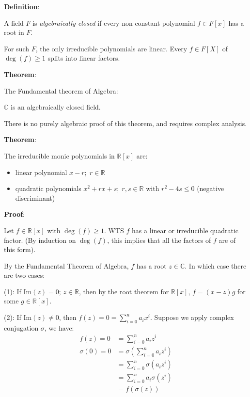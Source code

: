 \documentclass{article}
\begin{document}
\begin{multicols*}{2}
\textbf{Definition}:

A field $F$ is \textit{algebraically closed} if every non constant polynomial $f \in F[x]$ has a root in $F$.

For such $F$, the only irreducible polynomials are linear. Every $f \in F[X]$ of $\deg(f) \geq 1$ splits into linear factors.

\textbf{Theorem}:

The Fundamental theorem of Algebra:

$\mathbb{C}$ is an algebraically closed field.

There is no purely algebraic proof of this theorem, and requires complex analysis.

\textbf{Theorem}:

The irreducible monic polynomials in $\mathbb{R}[x]$ are:

\begin{itemize}
    \item linear polynomial $x - r;\; r \in \mathbb{R}$
    \item quadratic polynomials $x^2 + rx+s;\; r, s \in \mathbb{R}$
    \subitem with $r^2 - 4s \leq 0$ (negative discriminant)
\end{itemize}

\textbf{Proof}:

Let $f \in \mathbb{R}[x]$ with $\deg(f) \geq 1$. WTS $f$ has a linear or irreducible quadratic factor. (By induction on $\deg(f)$, this implies that all the factors of $f$ are of this form).

By the Fundamental Theorem of Algebra, $f$ has a root $z \in \mathbb{C}$. In which case there are two cases:

(1): If $\text{Im}(z) = 0$; $z \in \mathbb{R}$, then by the root theorem for $\mathbb{R}[x]$, $f = (x-z)g$ for some $g \in \mathbb{R}[x]$.

(2): If $\text{Im}(z) \neq 0$, then $f(z) = 0 = \sum_{i=0}^{n} a_ix^i$. Suppose we apply complex conjugation $\sigma$, we have:\[\begin{aligned}
    f(z) = 0 &= \sum_{i=0}^{n} a_iz^i\\
    \sigma(0) = 0 &= \sigma\left(\sum_{i=0}^{n} a_iz^i\right)\\
    &= \sum_{i=0}^{n} \sigma\left(a_iz^i\right)\\
    &= \sum_{i=0}^{n} a_i\sigma\left(z^i\right)\\
    &= f(\sigma(z))\\
\end{aligned}\]


\end{multicols*}
\end{document}
